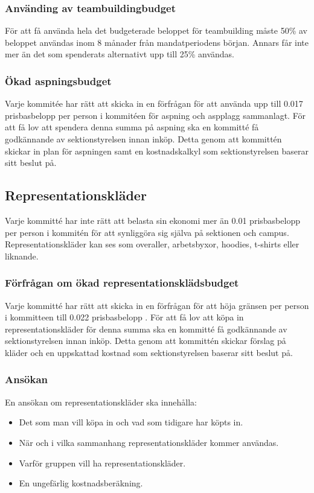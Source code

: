 \documentclass[a4paper]{dtek}
\newcommand{\prisbasbelopp}[1]{
    #1 prisbasbelopp
    \ifdef{\nuvarandeprisbasbelopp}{
        \marginpar{
            \small{ \textbf{\roundandprint{\xintiexpr#1 * \nuvarandeprisbasbelopp\relax}kr}}
        }
    }{}
}
\begin{document}
\subsubsection{Använding av teambuildingbudget}
För att få använda hela det budgeterade beloppet för teambuilding måste 50\% av beloppet användas inom 8 månader från mandatperiodens början. Annars får inte mer än det som spenderats alternativt upp till 25\% användas.

\subsubsection{Ökad aspningsbudget}
Varje kommitée har rätt att skicka in en förfrågan för att använda upp till
0.017 prisbasbelopp per person i kommitéen för aspning och aspplagg sammanlagt. För att
få lov att spendera denna summa på aspning ska en kommitté få godkännande av
sektionstyrelsen innan inköp. Detta genom att kommittén skickar in plan för aspningen samt
en kostnadskalkyl som sektionstyrelsen baserar sitt beslut på.


\subsection{Representationskläder}
Varje kommitté har inte rätt att belasta sin ekonomi mer än \prisbasbelopp{0.01} per person i kommitén
för att synliggöra sig själva på sektionen och campus. 
Representationskläder kan ses som overaller, arbetsbyxor, hoodies, t-shirts eller liknande.

\subsubsection{Förfrågan om ökad representationsklädsbudget}
Varje kommitté har rätt att skicka in en förfrågan för att höja gränsen
per person i kommitteen till \prisbasbelopp{0.022}.
För att få lov att köpa in representationskläder för denna summa ska en 
kommitté få godkännande av sektionstyrelsen innan inköp. Detta genom att kommittén 
skickar förslag på kläder och en uppskattad kostnad som sektionstyrelsen baserar 
sitt beslut på.

\subsubsection{Ansökan}
En ansökan om representationskläder ska innehålla:
\begin{itemize}
  \item Det som man vill köpa in och vad som tidigare har köpts in.
  \item När och i vilka sammanhang representationskläder kommer användas.
  \item Varför gruppen vill ha representationskläder.
  \item En ungefärlig kostnadsberäkning.
\end{itemize}
\end{document}
